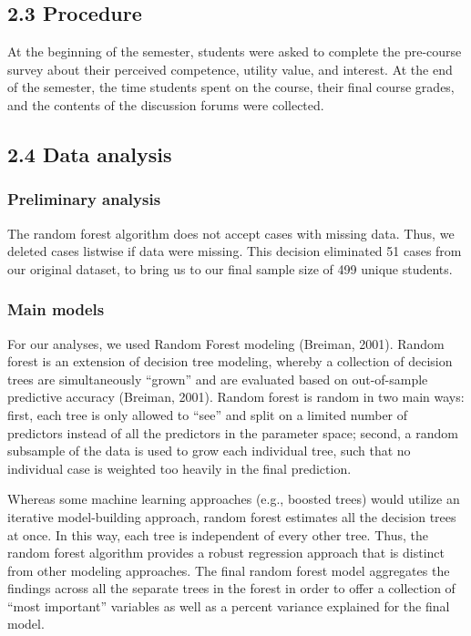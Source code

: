 \documentclass[acmart]{apa6}
\theoremstyle{definition}
\theoremstyle{definition}
\theoremstyle{definition}
\theoremstyle{remark}
\begin{document}
\subsection{2.3 Procedure}\label{procedure}

At the beginning of the semester, students were asked to complete the
pre-course survey about their perceived competence, utility value, and
interest. At the end of the semester, the time students spent on the
course, their final course grades, and the contents of the discussion
forums were collected.

\subsection{2.4 Data analysis}\label{data-analysis}

\subsubsection{Preliminary analysis}\label{preliminary-analysis}

The random forest algorithm does not accept cases with missing data.
Thus, we deleted cases listwise if data were missing. This decision
eliminated 51 cases from our original dataset, to bring us to our final
sample size of 499 unique students.

\subsubsection{Main models}\label{main-models}

For our analyses, we used Random Forest modeling (Breiman, 2001). Random
forest is an extension of decision tree modeling, whereby a collection
of decision trees are simultaneously \enquote{grown} and are evaluated
based on out-of-sample predictive accuracy (Breiman, 2001). Random
forest is random in two main ways: first, each tree is only allowed to
\enquote{see} and split on a limited number of predictors instead of all
the predictors in the parameter space; second, a random subsample of the
data is used to grow each individual tree, such that no individual case
is weighted too heavily in the final prediction.

Whereas some machine learning approaches (e.g., boosted trees) would
utilize an iterative model-building approach, random forest estimates
all the decision trees at once. In this way, each tree is independent of
every other tree. Thus, the random forest algorithm provides a robust
regression approach that is distinct from other modeling approaches. The
final random forest model aggregates the findings across all the
separate trees in the forest in order to offer a collection of
\enquote{most important} variables as well as a percent variance
explained for the final model.
\end{document}
